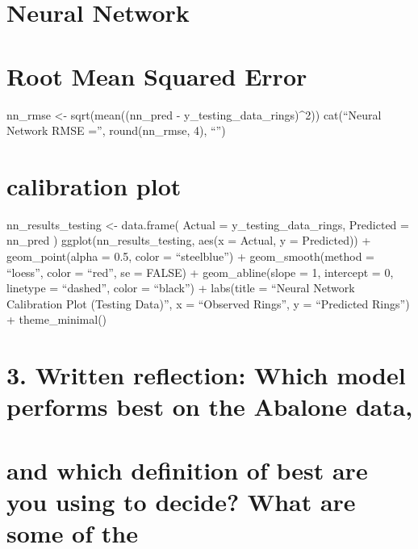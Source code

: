 \documentclass[
  letterpaper,
  DIV=11,
  numbers=noendperiod]{scrreprt}
\begin{document}
{

\chapter{Neural Network}\label{neural-network}


\chapter{Root Mean Squared Error}\label{root-mean-squared-error-2}

nn\_rmse \textless- sqrt(mean((nn\_pred -
y\_testing\_data\_rings)\^{}2)) cat(``Neural Network RMSE ='',
round(nn\_rmse, 4), ``\n'')


\chapter{calibration plot}\label{calibration-plot-1}

nn\_results\_testing \textless- data.frame( Actual =
y\_testing\_data\_rings, Predicted = nn\_pred )
ggplot(nn\_results\_testing, aes(x = Actual, y = Predicted)) +
geom\_point(alpha = 0.5, color = ``steelblue'') + geom\_smooth(method =
``loess'', color = ``red'', se = FALSE) + geom\_abline(slope = 1,
intercept = 0, linetype = ``dashed'', color = ``black'') + labs(title =
``Neural Network Calibration Plot (Testing Data)'', x = ``Observed
Rings'', y = ``Predicted Rings'') + theme\_minimal()


\chapter{3. Written reflection: Which model performs best on the Abalone
data,}\label{written-reflection-which-model-performs-best-on-the-abalone-data}


\chapter{and which definition of best are you using to decide? What are
some of
the}\label{and-which-definition-of-best-are-you-using-to-decide-what-are-some-of-the}


}
\end{document}
